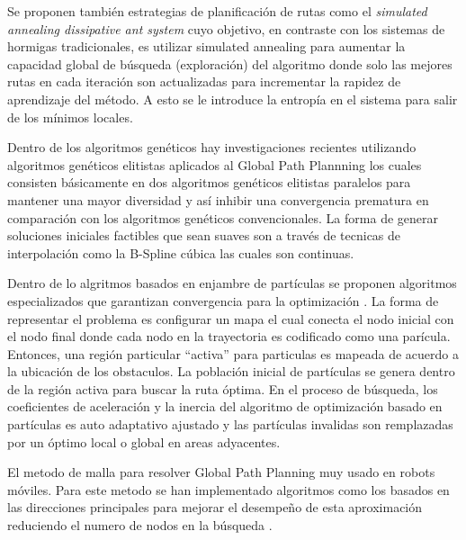 Se proponen tambi\'en estrategias de planificaci\'on de rutas como el \textit{simulated annealing dissipative ant system}  \cite{Wang08} cuyo objetivo, en contraste con los sistemas de hormigas tradicionales, es utilizar simulated annealing para aumentar la capacidad global de b\'usqueda (exploraci\'on) del algoritmo donde solo las mejores rutas en cada iteraci\'on son actualizadas para incrementar la rapidez de aprendizaje del m\'etodo. A esto se le introduce la entrop\'ia en el sistema para salir de los m\'inimos locales.

Dentro de los algoritmos gen\'eticos hay investigaciones recientes utilizando algoritmos gen\'eticos elitistas aplicados al Global Path Plannning \cite{Tsai} los cuales consisten b\'asicamente en dos algoritmos gen\'eticos elitistas paralelos  para mantener una mayor diversidad y as\'i inhibir una convergencia prematura en comparaci\'on con los algoritmos gen\'eticos convencionales. La forma de generar soluciones iniciales factibles que sean suaves son a trav\'es de tecnicas de interpolaci\'on como la B-Spline c\'ubica \cite{Tsai} las cuales son continuas.

Dentro de lo algritmos basados en enjambre de part\'iculas  se proponen algoritmos especializados que garantizan convergencia para la optimizaci\'on \cite{Zenyu10}. La forma de representar el problema es configurar un mapa el cual conecta el nodo inicial con el nodo final donde cada nodo en la trayectoria es codificado como una par\'icula.  Entonces, una regi\'on particular ``activa'' para particulas es mapeada de acuerdo a la ubicaci\'on de los obstaculos. La poblaci\'on inicial de part\'iculas se genera dentro de la regi\'on activa para buscar la ruta \'optima. En el proceso de b\'usqueda, los coeficientes de aceleraci\'on y la inercia del algoritmo de optimizaci\'on basado en part\'iculas  es auto adaptativo ajustado y las part\'iculas invalidas son remplazadas por un \'optimo local o global en areas adyacentes.

El metodo de malla para resolver Global Path Planning muy usado en robots m\'oviles. Para este metodo se han implementado algoritmos como los basados en las direcciones principales para mejorar el desempe\~no de esta aproximaci\'on reduciendo el numero de nodos en la b\'usqueda \cite{Zhenyu101}.


